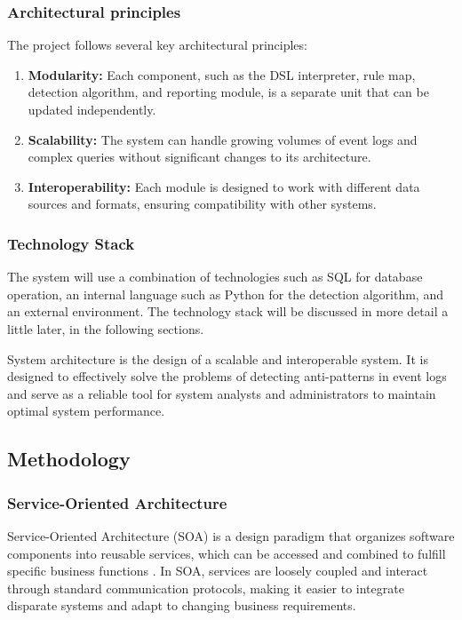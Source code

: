 \documentclass[12pt, times]{article}
\begin{document}
	\subsubsection*{Architectural principles}
	
	The project follows several key architectural principles:
	
	\begin{enumerate}
		\item  \textbf{Modularity: }Each component, such as the DSL interpreter, rule map, detection algorithm, and reporting module, is a separate unit that can be updated independently.
		\item \textbf{Scalability: }The system can handle growing volumes of event logs and complex queries without significant changes to its architecture.
		\item \textbf{Interoperability: }Each module is designed to work with different data sources and formats, ensuring compatibility with other systems.
	\end{enumerate}
	
	\subsubsection*{Technology Stack}
	
	\hspace{5mm}The system will use a combination of technologies such as SQL for database operation, an internal language such as Python \cite{python} for the detection algorithm, and an external environment. The technology stack will be discussed in more detail a little later, in the following sections.
	
	\hspace{5mm}System architecture is the design of a scalable and interoperable system. It is designed to effectively solve the problems of detecting anti-patterns in event logs and serve as a reliable tool for system analysts and administrators to maintain optimal system performance.
	
	\subsection{Methodology}
	
	\subsubsection{Service-Oriented Architecture}
	
	\hspace{5mm}Service-Oriented Architecture (SOA) is a design paradigm that organizes software components into reusable services, which can be accessed and combined to fulfill specific business functions \cite{soa}. In SOA, services are loosely coupled and interact through standard communication protocols, making it easier to integrate disparate systems and adapt to changing business requirements.
	
\end{document}
